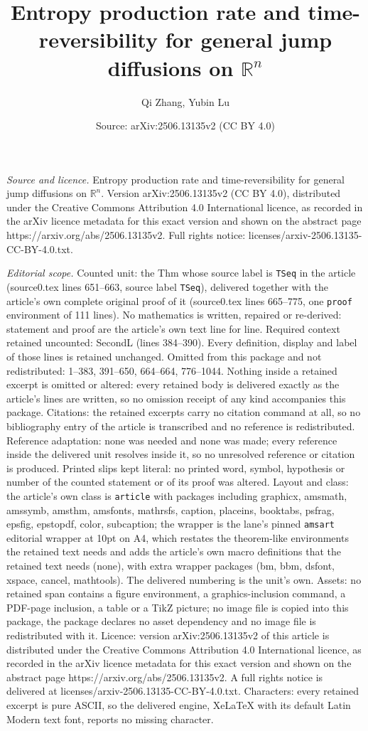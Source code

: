 \documentclass[10pt,a4paper]{amsart}
\title[Entropy production rate and time-reversibility for general j]{Entropy production rate and time-reversibility for general jump diffusions on $\mathbb{R}^n$}
\author{Qi Zhang, Yubin Lu}
\date{Source: arXiv:2506.13135v2 (CC BY 4.0)}
\begin{document}
\maketitle

\noindent\emph{Source and licence.} Entropy production rate and time-reversibility for general jump diffusions on $\mathbb{R}^n$. Version arXiv:2506.13135v2 (CC BY 4.0), distributed under the Creative Commons Attribution 4.0 International licence, as recorded in the arXiv licence metadata for this exact version and shown on the abstract page https://arxiv.org/abs/2506.13135v2. Full rights notice: licenses/arxiv-2506.13135-CC-BY-4.0.txt.\par\smallskip

\noindent\textit{Editorial scope.} Counted unit: the Thm whose source label is \texttt{TSeq} in the article (source0.tex lines 651--663, source label \texttt{TSeq}), delivered together with the article's own complete original proof of it (source0.tex lines 665--775, one \texttt{proof} environment of 111 lines). No mathematics is written, repaired or re-derived: statement and proof are the article's own text line for line. Required context retained uncounted: SecondL (lines 384--390). Every definition, display and label of those lines is retained unchanged. Omitted from this package and not redistributed: 1--383, 391--650, 664--664, 776--1044. Nothing inside a retained excerpt is omitted or altered: every retained body is delivered exactly as the article's lines are written, so no omission receipt of any kind accompanies this package. Citations: the retained excerpts carry no citation command at all, so no bibliography entry of the article is transcribed and no reference is redistributed. Reference adaptation: none was needed and none was made; every reference inside the delivered unit resolves inside it, so no unresolved reference or citation is produced. Printed slips kept literal: no printed word, symbol, hypothesis or number of the counted statement or of its proof was altered. Layout and class: the article's own class is \texttt{article} with packages including graphicx, amsmath, amssymb, amsthm, amsfonts, mathrsfs, caption, placeins, booktabs, psfrag, epsfig, epstopdf, color, subcaption; the wrapper is the lane's pinned \texttt{amsart} editorial wrapper at 10pt on A4, which restates the theorem-like environments the retained text needs and adds the article's own macro definitions that the retained text needs (none), with extra wrapper packages (bm, bbm, dsfont, xspace, cancel, mathtools). The delivered numbering is the unit's own. Assets: no retained span contains a figure environment, a graphics-inclusion command, a PDF-page inclusion, a table or a TikZ picture; no image file is copied into this package, the package declares no asset dependency and no image file is redistributed with it. Licence: version arXiv:2506.13135v2 of this article is distributed under the Creative Commons Attribution 4.0 International licence, as recorded in the arXiv licence metadata for this exact version and shown on the abstract page https://arxiv.org/abs/2506.13135v2. A full rights notice is delivered at licenses/arxiv-2506.13135-CC-BY-4.0.txt. Characters: every retained excerpt is pure ASCII, so the delivered engine, XeLaTeX with its default Latin Modern text font, reports no missing character.
\end{document}
